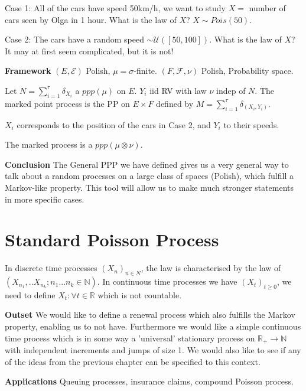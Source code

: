 Case 1: All of the cars have speed 50km/h, we want to study $X=$ number of cars seen by Olga in 1 hour. What is the law of $X$? $X \sim Pois(50)$.

Case 2: The cars have a random speed $ \sim \mathcal{U}([50,100]) $. What is the law of $X$? It may at first seem complicated, but it is not!

\noindent
\textbf{Framework} $(E, \mathcal{E})$ Polish, $\mu=\sigma$-finite. $(F, \mathcal{F}, \nu )$ Polish, Probability space.
\begin{defn}
	Let $N=\sum_{i=1}^{\tau} \delta_{X_i}$ a $ppp(\mu)$ on $E$. $Y_i$ iid RV with law $\nu $ indep of $N$. The marked point process is the PP on $E \times F$ defined by $M=\sum_{i=1}^{\tau} \delta_{(X_i, Y_i)}$.
\end{defn}

\begin{rmk}[]
	$X_i$ corresponds to the position of the cars in Case 2, and $Y_i$ to their speeds.
\end{rmk}

\begin{theorem}[]
	The marked process is a $ppp(\mu \otimes \nu )$.
\end{theorem}

\noindent \textbf{Conclusion} The General PPP we have defined gives us a very general way to talk about a random processes on a large class of spaces (Polish), which fulfill a Markov-like property. This tool will allow us to make much stronger statements in more specific cases.

\section{Standard Poisson Process}
In discrete time processes $(X_n)_{n\in N}$, the law is characterised by the law of $(X_{n_1},..X_{n_k}; n_1...n_k \in \mathbb{N})$. In continuous time processes we have $(X_t)_{t\geq 0}$, we need to define $X_t:\forall t \in \mathbb{R}$ which is not countable.

\noindent \textbf{Outset} We would like to define a renewal process which also fulfills the Markov property, enabling us to not have. Furthermore we would like a simple continuous time process which is in some way a 'universal' stationary process on $\mathbb{R}_+ \to \mathbb{N}$ with independent increments and jumps of size 1. We would also like to see if any of the ideas from the previous chapter can be specified to this context.

\textbf{Applications} Queuing processes, insurance claims, compound Poisson process.

